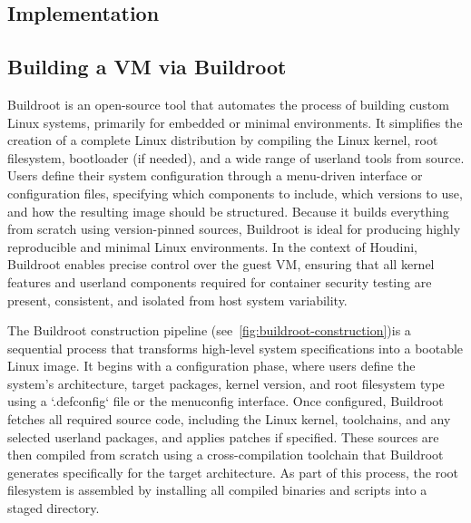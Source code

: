 \documentclass[12pt]{report}
\begin{document}
\begin{doublespace}
\chapter{Implementation}

\section{Building a VM via Buildroot}

Buildroot is an open-source tool that automates the process of building custom Linux systems, primarily for embedded or minimal environments. It simplifies the creation of a complete Linux distribution by compiling the Linux kernel, root filesystem, bootloader (if needed), and a wide range of userland tools from source. Users define their system configuration through a menu-driven interface or configuration files, specifying which components to include, which versions to use, and how the resulting image should be structured. Because it builds everything from scratch using version-pinned sources, Buildroot is ideal for producing highly reproducible and minimal Linux environments. In the context of Houdini, Buildroot enables precise control over the guest VM, ensuring that all kernel features and userland components required for container security testing are present, consistent, and isolated from host system variability.

The Buildroot construction pipeline (see~\ref{fig:buildroot-construction})is a sequential process that transforms high-level system specifications into a bootable Linux image. It begins with a configuration phase, where users define the system’s architecture, target packages, kernel version, and root filesystem type using a `.defconfig` file or the menuconfig interface. Once configured, Buildroot fetches all required source code, including the Linux kernel, toolchains, and any selected userland packages, and applies patches if specified. These sources are then compiled from scratch using a cross-compilation toolchain that Buildroot generates specifically for the target architecture. As part of this process, the root filesystem is assembled by installing all compiled binaries and scripts into a staged directory. 



\end{doublespace}
\end{document}
